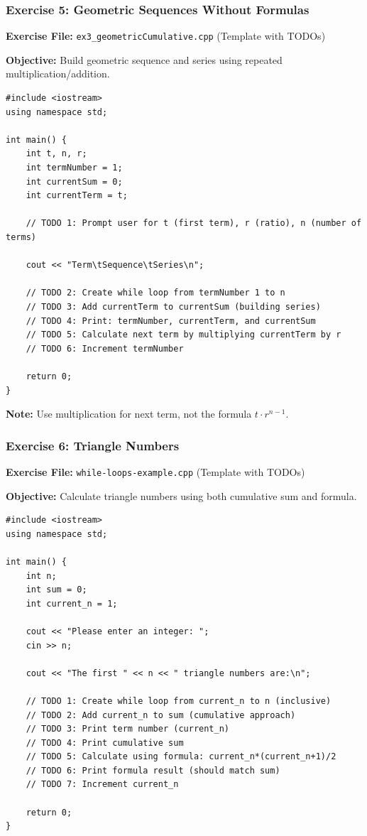 \documentclass{beamer}
\begin{document}
\begin{frame}[fragile]
\frametitle{Exercise 5: Geometric Sequences Without Formulas}
\textbf{Exercise File:} \texttt{ex3\_geometricCumulative.cpp} (Template with TODOs)

\pause
\textbf{Objective:} Build geometric sequence and series using repeated multiplication/addition.

\begin{verbatim}
#include <iostream>
using namespace std;

int main() {
    int t, n, r;
    int termNumber = 1;
    int currentSum = 0;
    int currentTerm = t;
    
    // TODO 1: Prompt user for t (first term), r (ratio), n (number of terms)
    
    cout << "Term\tSequence\tSeries\n";
    
    // TODO 2: Create while loop from termNumber 1 to n
    // TODO 3: Add currentTerm to currentSum (building series)
    // TODO 4: Print: termNumber, currentTerm, and currentSum
    // TODO 5: Calculate next term by multiplying currentTerm by r
    // TODO 6: Increment termNumber
    
    return 0;
}
\end{verbatim}

\textbf{Note:} Use multiplication for next term, not the formula $t \cdot r^{n-1}$.
\end{frame}

\begin{frame}[fragile]
\frametitle{Exercise 6: Triangle Numbers}
\textbf{Exercise File:} \texttt{while-loops-example.cpp} (Template with TODOs)

\pause
\textbf{Objective:} Calculate triangle numbers using both cumulative sum and formula.

\begin{verbatim}
#include <iostream>
using namespace std;

int main() {
    int n;
    int sum = 0;
    int current_n = 1;
    
    cout << "Please enter an integer: ";
    cin >> n;
    
    cout << "The first " << n << " triangle numbers are:\n";
    
    // TODO 1: Create while loop from current_n to n (inclusive)
    // TODO 2: Add current_n to sum (cumulative approach)
    // TODO 3: Print term number (current_n)
    // TODO 4: Print cumulative sum
    // TODO 5: Calculate using formula: current_n*(current_n+1)/2
    // TODO 6: Print formula result (should match sum)
    // TODO 7: Increment current_n
    
    return 0;
}
\end{verbatim}
\end{frame}
\end{document}

